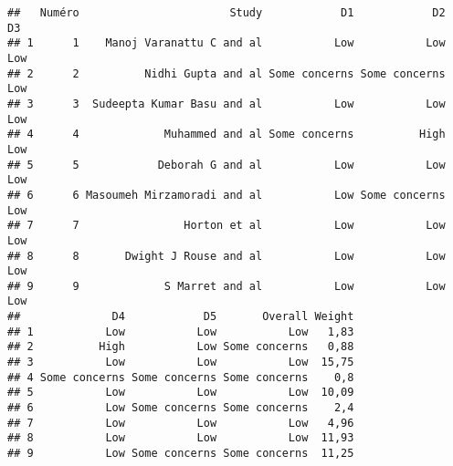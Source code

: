 \documentclass[
]{article}
\newenvironment{Shaded}{\begin{snugshade}}{\end{snugshade}}
\newcommand{\FunctionTok}[1]{\textcolor[rgb]{0.13,0.29,0.53}{\textbf{#1}}}
\newcommand{\NormalTok}[1]{#1}
\newcommand{\OtherTok}[1]{\textcolor[rgb]{0.56,0.35,0.01}{#1}}
\newcommand{\SpecialCharTok}[1]{\textcolor[rgb]{0.81,0.36,0.00}{\textbf{#1}}}
\newcommand{\StringTok}[1]{\textcolor[rgb]{0.31,0.60,0.02}{#1}}
\begin{document}
\begin{verbatim}
##   Numéro                       Study            D1            D2  D3
## 1      1    Manoj Varanattu C and al           Low           Low Low
## 2      2          Nidhi Gupta and al Some concerns Some concerns Low
## 3      3  Sudeepta Kumar Basu and al           Low           Low Low
## 4      4             Muhammed and al Some concerns          High Low
## 5      5            Deborah G and al           Low           Low Low
## 6      6 Masoumeh Mirzamoradi and al           Low Some concerns Low
## 7      7                Horton et al           Low           Low Low
## 8      8       Dwight J Rouse and al           Low           Low Low
## 9      9             S Marret and al           Low           Low Low
##              D4            D5       Overall Weight
## 1           Low           Low           Low   1,83
## 2          High           Low Some concerns   0,88
## 3           Low           Low           Low  15,75
## 4 Some concerns Some concerns Some concerns    0,8
## 5           Low           Low           Low  10,09
## 6           Low Some concerns Some concerns    2,4
## 7           Low           Low           Low   4,96
## 8           Low           Low           Low  11,93
## 9           Low Some concerns Some concerns  11,25
\end{verbatim}

\begin{Shaded}
\end{Shaded}
\end{document}
